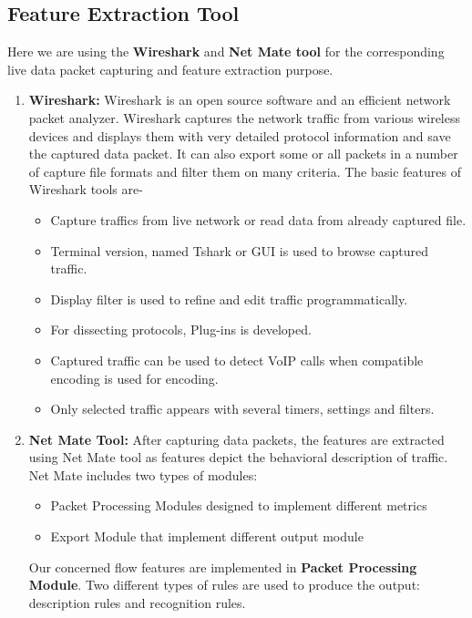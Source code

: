 \subsection{Feature Extraction Tool}
Here we are using the \textbf{Wireshark} and \textbf{Net Mate tool} for the corresponding live data packet capturing and feature extraction purpose.
\begin{enumerate}
    \item \textbf{Wireshark:} Wireshark is an open source software and an efficient network packet analyzer. Wireshark captures the network traffic from various wireless devices and displays them with very detailed protocol information and save the captured data packet. It can also export some or all packets in a number of capture file formats and filter them on many criteria. The basic features of Wireshark tools are-
    \begin{itemize}
        \item Capture traffics from live network or read data from already captured file.
        \item Terminal version, named Tshark or GUI is used to browse captured traffic.
        \item Display filter is used to refine and edit traffic programmatically.
        \item For dissecting protocols, Plug-ins is developed.
        \item Captured traffic can be used to detect VoIP calls when compatible encoding is used for encoding. 
        \item Only selected traffic appears with several timers, settings and filters.
    \end{itemize}
    \item \textbf{Net Mate Tool:} After capturing data packets, the features are extracted using Net Mate tool as features depict the behavioral description of traffic. Net Mate includes two types of modules:
    \begin{itemize}
        \item Packet Processing Modules designed to implement different metrics 
        \item Export Module that implement different output module
    \end{itemize}
    Our concerned flow features are implemented in \textbf{Packet Processing Module}. Two different types of rules are used to produce the output: description rules and recognition rules.
\end{enumerate}
